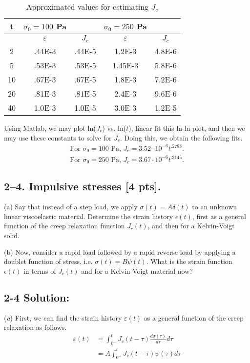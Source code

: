 \begin{table}[h!]
    \centering
    \begin{tabular}{|c|c|c|c|c|}
    \hline
        t & $\sigma_0=100$ Pa &  & $\sigma_0=250$ Pa & \\
        \hline
         & $\varepsilon$ & $J_c$ & $\varepsilon$ & $J_c$\\
         \hline
        2 & .44E-3 & .44E-5 & 1.2E-3 & 4.8E-6\\
        5 & .53E-3 & .53E-5 & 1.45E-3 & 5.8E-6\\
        10 & .67E-3 & .67E-5 & 1.8E-3 & 7.2E-6\\
        20 & .81E-3 & .81E-5 & 2.4E-3 & 9.6E-6\\
        40 & 1.0E-3 & 1.0E-5 & 3.0E-3 & 1.2E-5\\
        \hline
    \end{tabular}
    \caption{Approximated values for estimating $J_c$}
    \label{tab:2-3Sol}
\end{table}

Using Matlab, we may plot ln($J_c$) vs. ln($t$), linear fit this ln-ln plot, and then we may use these constants to solve for $J_c$. Doing this, we obtain the following fits.
\begin{gather*}
    \text{For }\sigma_0=100\text{ Pa, } J_c=3.52\cdot10^{-6}t^{.2788}.\\
    \text{For }\sigma_0=250\text{ Pa, } J_c=3.67\cdot10^{-6}t^{.3145}.
\end{gather*}

\bigskip
\subsection*{2--4. \textbf{Impulsive stresses} [4 pts].}

(a) Say that instead of a step load, we apply $\sigma(t) = A \delta(t)$ to an unknown linear viscoelastic material. 
Determine the strain history $\epsilon(t)$, first as a general function of the creep relaxation function $J_c(t)$, and then for a Kelvin-Voigt solid. 

(b) Now, consider a rapid load followed by a rapid reverse load by applying a doublet function of stress, i.e. $\sigma(t) = B \psi(t)$. 
What is the strain function $\epsilon(t)$ in terms of $J_c(t)$ and for a Kelvin-Voigt material now? 

\subsection*{\textbf{2-4 Solution:}}
(\textit{a}) First, we can find the strain history $\varepsilon(t)$ as a general function of the creep relaxation as follows.
\begin{align*}
    \varepsilon(t)&=\int_{0^-}^tJ_c(t-\tau)\frac{d\sigma(\tau)}{d\tau}d\tau\\
    &=A\int_{0^-}^tJ_c(t-\tau)\psi(\tau)d\tau
\end{align*}

